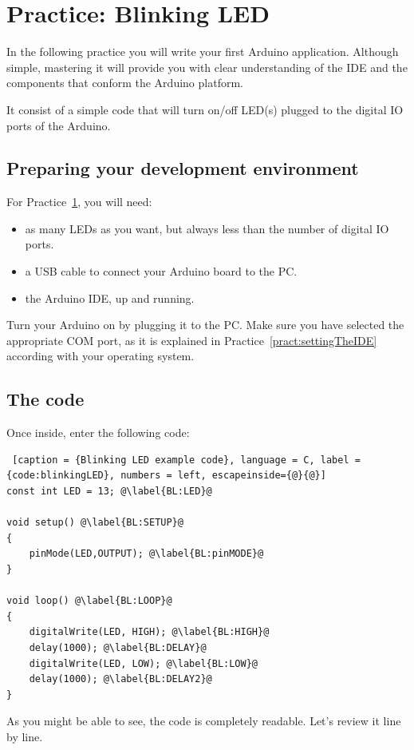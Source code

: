 \section{Practice: Blinking LED}\label{pract:blinkingLED}
In the following practice you will write your first Arduino application. Although simple, mastering it will provide you with clear understanding of the IDE and the components that conform the Arduino platform.

It consist of a simple code that will turn on/off LED(s) plugged to the digital IO ports of the Arduino.

\subsection{Preparing your development environment}
For Practice~\ref{pract:blinkingLED}, you will need:
\begin{itemize}
 \item as many LEDs as you want, but always less than the number of digital IO ports.
 \item a USB cable to connect your Arduino board to the PC.
 \item the Arduino IDE, up and running.
\end{itemize}

Turn your Arduino on by plugging it to the PC. Make sure you have selected the appropriate COM port, as it is explained in Practice~\ref{pract:settingTheIDE} according with your operating system.

\subsection{The code} 
Once inside, enter the following code:

\begin{lstlisting} [caption = {Blinking LED example code}, language = C, label = {code:blinkingLED}, numbers = left, escapeinside={@}{@}]
const int LED = 13; @\label{BL:LED}@

void setup() @\label{BL:SETUP}@
{
	pinMode(LED,OUTPUT); @\label{BL:pinMODE}@
}

void loop() @\label{BL:LOOP}@
{
	digitalWrite(LED, HIGH); @\label{BL:HIGH}@
	delay(1000); @\label{BL:DELAY}@
	digitalWrite(LED, LOW); @\label{BL:LOW}@
	delay(1000); @\label{BL:DELAY2}@
}
\end{lstlisting}

As you might be able to see, the code is completely readable. Let's review it line by line.

